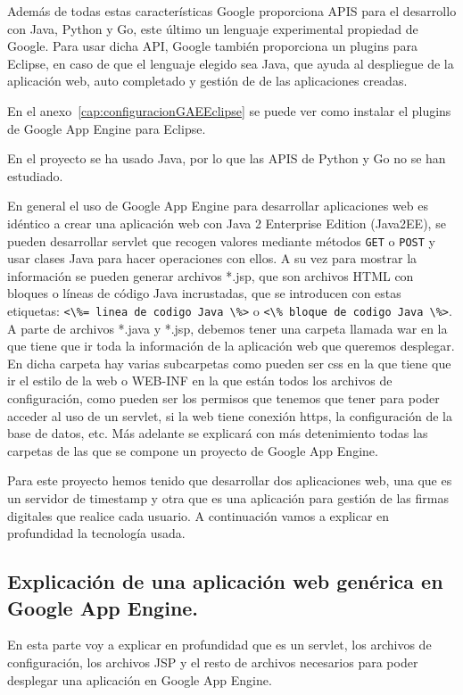 \begin{itemize}
Además de todas estas características Google proporciona APIS para el desarrollo con Java, Python y Go, este último un lenguaje experimental propiedad de Google. Para usar dicha API, Google también proporciona un plugins para Eclipse, en caso de que el lenguaje elegido sea Java, que ayuda al despliegue de la aplicación web, auto completado y gestión de de las aplicaciones creadas. 

En el anexo~\ref{cap:configuracionGAEEclipse} se puede ver como instalar el plugins de Google App Engine para Eclipse.

En el proyecto se ha usado Java, por lo que las APIS de Python y Go no se han estudiado.

En general el uso de Google App Engine para desarrollar aplicaciones web es idéntico a crear una aplicación web con Java 2 Enterprise Edition (Java2EE), se pueden desarrollar servlet que recogen valores mediante métodos \lstinline{GET} o \lstinline{POST} y usar clases Java para hacer operaciones con ellos. A su vez para mostrar la información se pueden generar archivos *.jsp, que son archivos HTML con bloques o líneas de código Java incrustadas, que se introducen con estas etiquetas: \lstinline{<\%= linea de codigo Java \%>} o \lstinline{<\% bloque de codigo Java \%>}. A parte de archivos *.java y *.jsp, debemos tener una carpeta llamada war en la que tiene que ir toda la información de la aplicación web que queremos desplegar. En dicha carpeta hay varias subcarpetas como pueden ser css en la que tiene que ir el estilo de la web o WEB-INF en la que están todos los archivos de configuración, como pueden ser los permisos que tenemos que tener para poder acceder al uso de un servlet, si la web tiene conexión https, la configuración de la base de datos, etc. Más adelante se explicará con más detenimiento todas las carpetas de las que se compone un proyecto de Google App Engine.

Para este proyecto hemos tenido que desarrollar dos aplicaciones web, una que es un servidor de timestamp y otra que es una aplicación para gestión de las firmas digitales que realice cada usuario. A continuación vamos a explicar en profundidad la tecnología usada.

\subsection[Aplicación web genérica en GAE]{Explicación de una aplicación web genérica en Google App Engine.}
En esta parte voy a explicar en profundidad que es un servlet, los archivos de configuración, los archivos JSP y el resto de archivos necesarios para poder desplegar una aplicación en Google App Engine.
 

\end{itemize}
